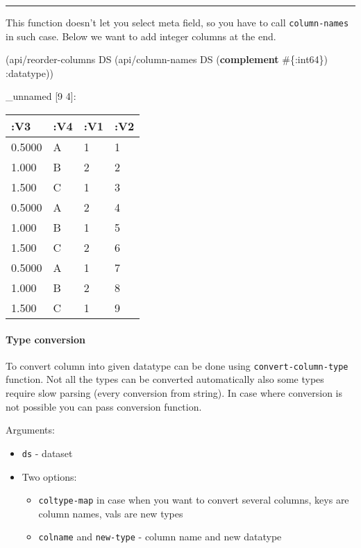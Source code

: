 \documentclass[]{article}
\newenvironment{Shaded}{\begin{snugshade}}{\end{snugshade}}
\newcommand{\KeywordTok}[1]{\textcolor[rgb]{0.13,0.29,0.53}{\textbf{#1}}}
\newcommand{\AttributeTok}[1]{\textcolor[rgb]{0.77,0.63,0.00}{#1}}
\newcommand{\NormalTok}[1]{#1}
\providecommand{\tightlist}{%
  \setlength{\itemsep}{0pt}\setlength{\parskip}{0pt}}
\let\oldparagraph\paragraph
\renewcommand{\paragraph}[1]{\oldparagraph{#1}\mbox{}}
\begin{document}
\begin{center}\rule{0.5\linewidth}{0.5pt}\end{center}

This function doesn't let you select meta field, so you have to call
\texttt{column-names} in such case. Below we want to add integer columns
at the end.

\begin{Shaded}
\begin{Highlighting}[]
\NormalTok{(api/reorder-columns DS (api/column-names DS (}\KeywordTok{complement}\NormalTok{ #\{}\AttributeTok{:int64}\NormalTok{\}) }\AttributeTok{:datatype}\NormalTok{))}
\end{Highlighting}
\end{Shaded}

\_unnamed {[}9 4{]}:

\begin{longtable}[]{@{}llll@{}}
\toprule
:V3 & :V4 & :V1 & :V2\tabularnewline
\midrule
\endhead
0.5000 & A & 1 & 1\tabularnewline
1.000 & B & 2 & 2\tabularnewline
1.500 & C & 1 & 3\tabularnewline
0.5000 & A & 2 & 4\tabularnewline
1.000 & B & 1 & 5\tabularnewline
1.500 & C & 2 & 6\tabularnewline
0.5000 & A & 1 & 7\tabularnewline
1.000 & B & 2 & 8\tabularnewline
1.500 & C & 1 & 9\tabularnewline
\bottomrule
\end{longtable}

\paragraph{Type conversion}\label{type-conversion}

To convert column into given datatype can be done using
\texttt{convert-column-type} function. Not all the types can be
converted automatically also some types require slow parsing (every
conversion from string). In case where conversion is not possible you
can pass conversion function.

Arguments:

\begin{itemize}
\tightlist
\item
  \texttt{ds} - dataset
\item
  Two options:

  \begin{itemize}
  \tightlist
  \item
    \texttt{coltype-map} in case when you want to convert several
    columns, keys are column names, vals are new types
  \item
    \texttt{colname} and \texttt{new-type} - column name and new
    datatype
  \end{itemize}
\end{itemize}
\end{document}
